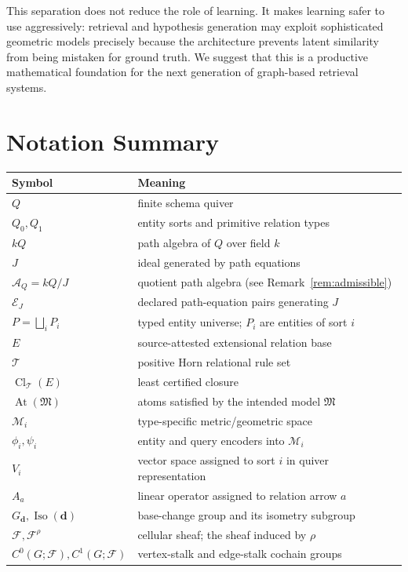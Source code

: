 \documentclass[11pt]{article}
\newcommand{\Cl}{\operatorname{Cl}}
\newcommand{\At}{\operatorname{At}}
\newcommand{\Iso}{\operatorname{Iso}}
\newcommand{\T}{\mathcal{T}}
\newcommand{\A}{\mathcal{A}}
\newcommand{\F}{\mathcal{F}}
\newcommand{\M}{\mathcal{M}}
\begin{document}
This separation does not reduce the role of learning. It makes learning safer to use aggressively: retrieval and hypothesis generation may exploit sophisticated geometric models precisely because the architecture prevents latent similarity from being mistaken for ground truth. We suggest that this is a productive mathematical foundation for the next generation of graph-based retrieval systems.




\appendix
\section{Notation Summary}
\begin{longtable}{p{}p{}}
\toprule
Symbol & Meaning \\
\midrule
$Q$ & finite schema quiver \\
$Q_0,Q_1$ & entity sorts and primitive relation types \\
$kQ$ & path algebra of $Q$ over field $k$ \\
$J$ & ideal generated by path equations \\
$\A_Q=kQ/J$ & quotient path algebra (see Remark~\ref{rem:admissible}) \\
$\mathcal{E}_J$ & declared path-equation pairs generating $J$ \\
$P=\bigsqcup_i P_i$ & typed entity universe; $P_i$ are entities of sort $i$ \\
$E$ & source-attested extensional relation base \\
$\T$ & positive Horn relational rule set \\
$\Cl_{\T}(E)$ & least certified closure \\
$\At(\mathfrak{M})$ & atoms satisfied by the intended model $\mathfrak{M}$ \\
$\M_i$ & type-specific metric/geometric space \\
$\phi_i,\psi_i$ & entity and query encoders into $\M_i$ \\
$V_i$ & vector space assigned to sort $i$ in quiver representation \\
$A_a$ & linear operator assigned to relation arrow $a$ \\
$G_{\bm d},\Iso(\bm d)$ & base-change group and its isometry subgroup \\
$\F,\F^{\rho}$ & cellular sheaf; the sheaf induced by $\rho$ \\
$C^0(G;\F),C^1(G;\F)$ & vertex-stalk and edge-stalk cochain groups \\

\end{longtable}
\end{document}
